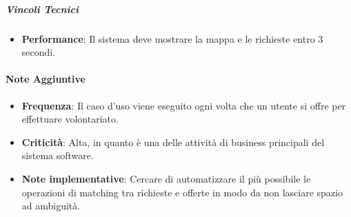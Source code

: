 \subparagraph*{Vincoli Tecnici}

\begin{itemize}
    \item \textbf{Performance}: Il sistema deve mostrare la mappa e le richieste entro 3 secondi.
\end{itemize}

\paragraph{Note Aggiuntive}

\begin{itemize}
    \item \textbf{Frequenza}: Il caso d’uso viene eseguito ogni volta che un utente si offre per effettuare volontariato.
    \item \textbf{Criticità}: Alta, in quanto è una delle attività di business principali del sistema software.
    \item \textbf{Note implementative}: Cercare di automatizzare il più possibile le operazioni di matching tra richieste e offerte in modo da non lasciare spazio ad ambiguità.
\end{itemize}